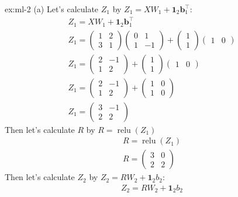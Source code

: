 \begin{solution}{ex:ml-2}
  (a)
  Let's calculate $Z_1$ by $Z_1=XW_1+\mathbf{1}_2\mathbf{b}_1^{\!\top}$:
  \[
    \begin{gathered}
      Z_1=XW_1+\mathbf{1}_2\mathbf{b}_1^{\!\top}\\
      Z_1=\begin{pmatrix}1&2\\3&1\end{pmatrix}\begin{pmatrix}0&1\\1&-1\end{pmatrix}+\begin{pmatrix}1\\1\end{pmatrix}\begin{pmatrix}1&0\end{pmatrix}\\
      Z_1=\begin{pmatrix}2&-1\\1&2\end{pmatrix}+\begin{pmatrix}1\\1\end{pmatrix}\begin{pmatrix}1&0\end{pmatrix}\\
      Z_1=\begin{pmatrix}2&-1\\1&2\end{pmatrix}+\begin{pmatrix}1&0\\1&0\end{pmatrix}\\
      Z_1=\begin{pmatrix}3&-1\\2&2\end{pmatrix}
    \end{gathered}
  \]
  Then let's calculate $R$ by $R=\operatorname{relu}(Z_1)$
  \[
    \begin{gathered}
      R=\operatorname{relu}(Z_1)\\
      R=\begin{pmatrix}3&0\\2&2\end{pmatrix}
    \end{gathered}
  \]
  Then let's calculate $Z_2$ by $Z_2=RW_2+\mathbf{1}_2b_2$:
  \[
    \begin{gathered}
      Z_2=RW_2+\mathbf{1}_2b_2\\

\end{gathered}\]
\end{solution}
